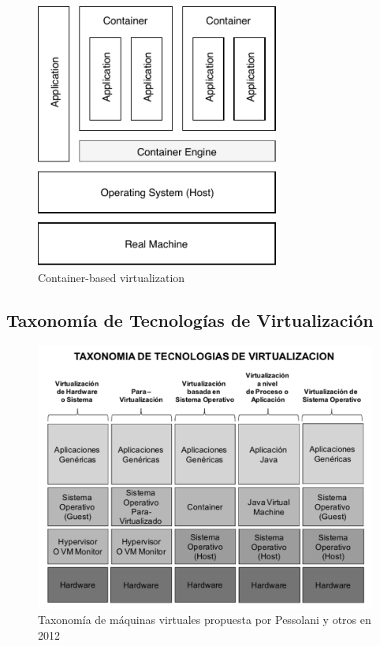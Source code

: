 \begin{figure}[ht] %
	\centering
	\includegraphics[width=8cm]{Pictures/container-baseVirtualization.pdf}
	\vspace{-0.2cm}
	\caption{Container-based virtualization}
	\label{fig:container-baseVirtualization}
\end{figure}


\subsection{Taxonomía de Tecnologías de Virtualización}\label{sec:taxonomía}
\vspace{5mm}

\begin{figure}[!htp]
	\centering
	\includegraphics[width=0.8 \linewidth]{Pictures/taxonomiaPessolani.png}
	\vspace{-0.2cm}
	\caption{Taxonomía de máquinas virtuales propuesta por Pessolani y otros en 2012\footnotemark[8]{}}
	\label{fig:taxonomiaPessolani}
\end{figure}

